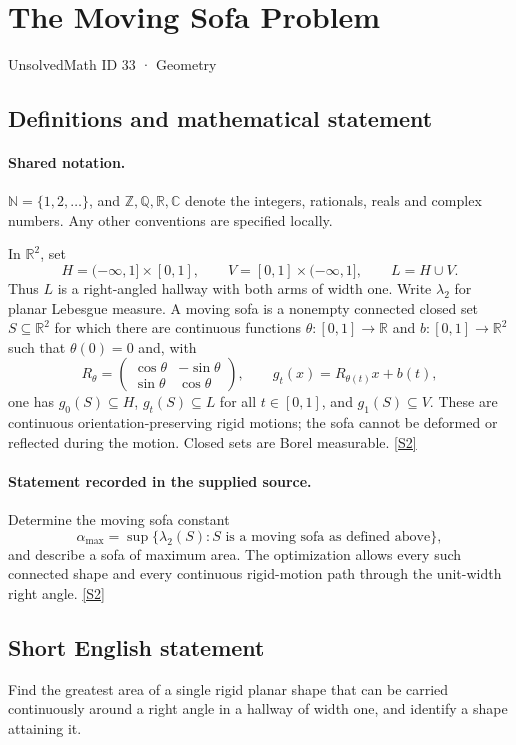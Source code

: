 \documentclass[11pt]{article}
\newcommand{\sref}[2]{\hyperlink{source:#1:#2}{[S#2]}}
\begin{document}
\setcounter{section}{32}
\section{The Moving Sofa Problem}\label{33}
{\small\sffamily UnsolvedMath ID 33 · Geometry}
\subsection{Definitions and mathematical statement}

\paragraph{Shared notation.}$\mathbb N=\{1,2,\ldots\}$, and $\mathbb Z,\mathbb Q,\mathbb R,\mathbb C$ denote the integers, rationals, reals and complex numbers. Any other conventions are specified locally.


In $\mathbb R^2$, set
\[
 H=(-\infty,1]\times[0,1],\qquad
 V=[0,1]\times(-\infty,1],\qquad L=H\cup V.
\]
Thus $L$ is a right-angled hallway with both arms of width one. Write $\lambda_2$ for planar Lebesgue measure. A moving sofa is a nonempty connected closed set $S\subseteq\mathbb R^2$ for which there are continuous functions $\theta:[0,1]\to\mathbb R$ and $b:[0,1]\to\mathbb R^2$ such that $\theta(0)=0$ and, with
\[
 R_\theta=\begin{pmatrix}\cos\theta&-\sin\theta\\ \sin\theta&\cos\theta\end{pmatrix},
 \qquad g_t(x)=R_{\theta(t)}x+b(t),
\]
one has $g_0(S)\subseteq H$, $g_t(S)\subseteq L$ for all $t\in[0,1]$, and $g_1(S)\subseteq V$. These are continuous orientation-preserving rigid motions; the sofa cannot be deformed or reflected during the motion. Closed sets are Borel measurable. \sref{33}{2}
\paragraph{Statement recorded in the supplied source.}
Determine the moving sofa constant
\[
 \alpha_{\max}=\sup\{\lambda_2(S): S\text{ is a moving sofa as defined above}\},
\]
and describe a sofa of maximum area. The optimization allows every such connected shape and every continuous rigid-motion path through the unit-width right angle. \sref{33}{2}
\subsection{Short English statement}
Find the greatest area of a single rigid planar shape that can be carried continuously around a right angle in a hallway of width one, and identify a shape attaining it.
\end{document}
